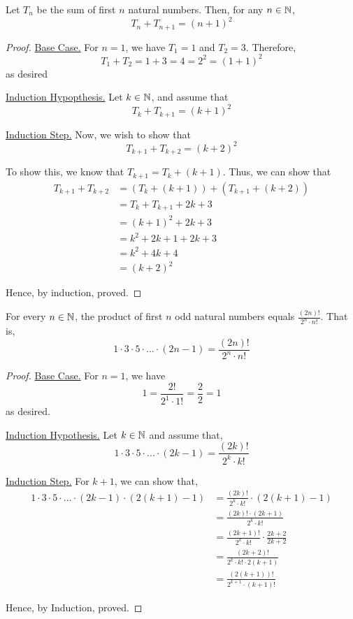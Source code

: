 \begin{proposition}
	Let $T_n$ be the sum of first $n$ natural numbers. Then, for any $n \in \mathbb{N}$, $$T_n + T_{n+1} = (n+1)^2$$
\end{proposition}
\begin{proof}
	\underline{Base Case.} For $n = 1$, we have $T_1 = 1$ and $T_2 = 3$. 
	Therefore,
	$$T_1 + T_2 = 1 + 3 = 4 = 2^2 = (1+1)^2$$
	as desired

	\underline{Induction Hypopthesis.} Let $k \in \mathbb{N}$, and assume that
	$$T_k + T_{k+1} = (k+1)^2$$

	\underline{Induction Step.} Now, we wish to show that
	$$T_{k+1} + T_{k+2} = (k+2)^2$$

	To show this, we know that $T_{k+1} = T_k + (k+1)$. Thus, we can show that
	\begin{align*}
		T_{k+1} + T_{k+2} &= (T_k + (k+1)) + (T_{k+1} + (k+2)) \\
											&= T_k + T_{k+1} + 2k+3 \\
											&= (k+1)^2 + 2k + 3 \\
											&= k^2 + 2k + 1 + 2k + 3 \\
											&= k^2 + 4k + 4 \\
											&= (k+2)^2
	\end{align*}
	
	Hence, by induction, proved.
\end{proof}

\begin{proposition}
	For every $n \in \mathbb{N}$, the product of first $n$ odd natural numbers equals $\frac{(2n)!}{2^n \cdot n!}$. That is,
	$$1 \cdot 3 \cdot 5 \cdot ... \cdot (2n-1) = \frac{(2n)!}{2^n \cdot n!}$$
\end{proposition}
\begin{proof}
	\underline{Base Case.} For $n = 1$, we have
	$$1 = \frac{2!}{2^1 \cdot 1!} = \frac{2}{2} = 1$$
	as desired.

	\underline{Induction Hypothesis.} Let $k \in \mathbb{N}$ and assume that,
	$$1 \cdot 3 \cdot 5 \cdot ... \cdot (2k-1) = \frac{(2k)!}{2^k \cdot k!}$$

	\underline{Induction Step.} For $k+1$, we can show that,
	\begin{align*}
		1 \cdot 3 \cdot 5 \cdot ... \cdot (2k-1) \cdot (2(k+1)-1)
			&= \frac{(2k)!}{2^k \cdot k!} \cdot (2(k+1)-1) \\
			&= \frac{(2k)! \cdot (2k+1)}{2^k \cdot k!} \\
			&= \frac{(2k+1)!}{2^k \cdot k!} \cdot \frac{2k+2}{2k+2} \\
			&= \frac{(2k+2)!}{2^k \cdot k! \cdot 2(k+1)} \\
			&= \frac{(2(k+1))!}{2^{k+1} \cdot (k+1)!}
	\end{align*}

	Hence, by Induction, proved.
\end{proof}


